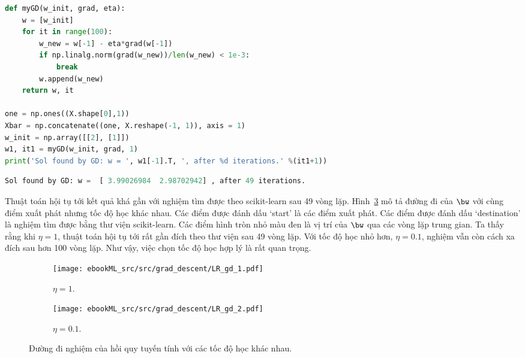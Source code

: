 \begin{lstlisting}[language=Python]
def myGD(w_init, grad, eta):
    w = [w_init]
    for it in range(100):
        w_new = w[-1] - eta*grad(w[-1])
        if np.linalg.norm(grad(w_new))/len(w_new) < 1e-3:
            break
        w.append(w_new)
    return w, it

one = np.ones((X.shape[0],1))
Xbar = np.concatenate((one, X.reshape(-1, 1)), axis = 1)
w_init = np.array([[2], [1]])
w1, it1 = myGD(w_init, grad, 1)
print('Sol found by GD: w = ', w1[-1].T, ', after %d iterations.' %(it1+1))
\end{lstlisting}
\kq
\begin{lstlisting}[language=Python]
Sol found by GD: w =  [ 3.99026984  2.98702942] , after 49 iterations.
\end{lstlisting}

Thuật toán hội tụ tới kết quả khá gần với nghiệm tìm được theo scikit-learn sau
49 vòng lặp. Hình~\ref{fig:7_lrgd} mô tả đường đi của $\bw$ với cùng điểm xuất
phát nhưng tốc độ học khác nhau. Các điểm được đánh dấu `start' là các điểm xuất
phát. Các điểm được đánh dấu `destination' là nghiệm tìm được bằng thư viện
scikit-learn. Các điểm hình tròn nhỏ màu đen là vị trí của $\bw$ qua các vòng
lặp trung gian. Ta thấy rằng khi $\eta = 1$, thuật toán hội tụ tới rất gần đích
theo thư viện sau 49 vòng lặp. Với tốc độ học nhỏ hơn, $\eta = 0.1$, nghiệm vẫn
còn cách xa đích sau hơn 100 vòng lặp. Như vậy, việc chọn tốc độ học hợp lý là
rất quan trọng.


\begin{figure}[t]
\begin{subfigure}{0.495\textwidth}
\texttt{[image: ebookML\_src/src/grad\_descent/LR\_gd\_1.pdf]}
\caption{$\eta = 1$.}
\label{fig:7_lrgda}
\end{subfigure}
\begin{subfigure}{0.495\textwidth}
\texttt{[image: ebookML\_src/src/grad\_descent/LR\_gd\_2.pdf]}
\caption{$\eta = 0.1$.}
\label{fig:7_lrgdb}
\end{subfigure}
\caption{
Đường đi nghiệm của hồi quy tuyến tính với các tốc độ học khác nhau.
}
\label{fig:7_lrgd}
\end{figure}

